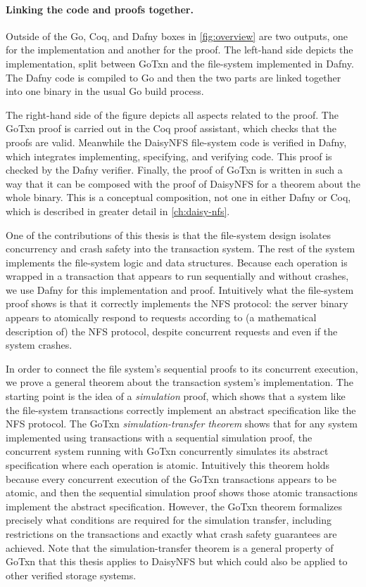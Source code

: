 \paragraph{Linking the code and proofs together.}
Outside of the Go, Coq, and Dafny boxes in \cref{fig:overview} are two outputs,
one for the implementation and another for the proof.
The left-hand side depicts the implementation, split between GoTxn
and the file-system implemented in Dafny. The Dafny code is compiled to Go and
then the two parts are linked together into one  binary in the
usual Go build process.

The right-hand side of the figure depicts all aspects related to the
proof. The GoTxn proof is carried out in the Coq proof assistant, which checks
that the proofs are valid.
Meanwhile
the DaisyNFS file-system code is verified in Dafny, which integrates
implementing, specifying, and verifying code. This proof is checked by the Dafny
verifier. Finally, the proof of GoTxn is written in such a way that it can be
composed with the proof of DaisyNFS for a theorem about the whole
 binary. This is a conceptual composition, not one in either
Dafny or Coq, which is described in greater detail in \cref{ch:daisy-nfs}.

One of the contributions of this thesis is that the file-system design isolates
concurrency and crash safety into the transaction system. The rest of the system
implements the file-system logic and data structures. Because each operation is
wrapped in a transaction that appears to run sequentially and without crashes,
we use Dafny for this implementation and proof. Intuitively what the file-system
proof shows is that it correctly implements the NFS protocol: the
 server binary appears to atomically respond to requests
according to (a mathematical description of) the NFS protocol, despite
concurrent requests and even if the system crashes.

In order to connect the file system's sequential proofs to its concurrent
execution, we prove a general theorem about the transaction system's
implementation. The starting point is the idea of a \emph{simulation} proof,
which shows that a system like the file-system transactions correctly implement an
abstract specification like the NFS protocol. The GoTxn
\emph{simulation-transfer theorem} shows that for any system implemented using
transactions with a sequential simulation proof, the concurrent system running
with GoTxn concurrently simulates its abstract specification where each
operation is atomic. Intuitively this theorem holds because every concurrent
execution of the GoTxn transactions appears to be atomic, and then the
sequential simulation proof shows those atomic transactions implement the
abstract specification. However, the GoTxn theorem formalizes precisely what
conditions are required for the simulation transfer, including restrictions on
the transactions and exactly what crash safety guarantees are achieved. Note
that the simulation-transfer theorem is a general property of GoTxn that this
thesis applies to DaisyNFS but which could also be applied to other verified
storage systems.

